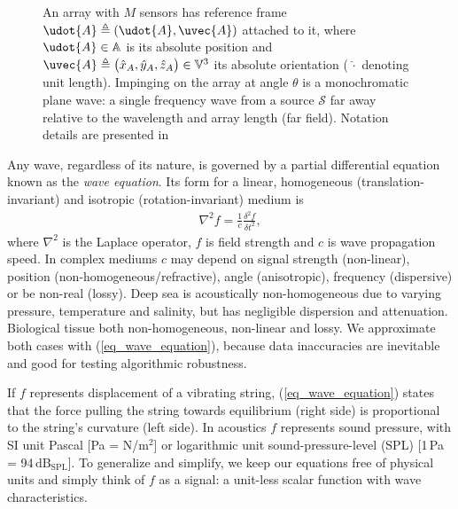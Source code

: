 {\begin{figure}[!t]\centering
{}
\caption{
An array with $M$ sensors has reference frame $\udot{A} \triangleq (\udot{A},\uvec{A})$ attached to it, where $\udot{A}\in\mathbb{A}$ is its absolute position and $\uvec{A}\triangleq\big(\hat{x}_{A},\hat{y}_{A},\hat{z}_{A}\big)\in\mathbb{V}^3$ its absolute orientation (\,$\hat{\cdot}$ denoting unit length). Impinging on the array at angle $\theta$ is a monochromatic plane wave: a single frequency wave from a source $\mathcal{S}$ far away relative to the wavelength and array length (far field). Notation details are presented in 
}%
\label{2_fig_geometry}
\end{figure}


Any wave, regardless of its nature, is governed by a partial differential equation known as the \emph{wave equation}. Its form for a linear, homogeneous (translation-invariant) and isotropic (rotation-invariant) medium is
%
\begin{align}\label{eq_wave_equation}
\nabla^2 f 
 = \frac{1}{c}\frac{\delta^2 f}{\delta t^2},
\end{align}
%
where $\nabla^2$ is the Laplace operator, $f$ is field strength and $c$ is wave propagation speed. In complex mediums $c$ may depend on signal strength (non-linear), position (non-homogeneous/refractive), angle (anisotropic), frequency (dispersive) or be non-real (lossy). Deep sea is acoustically non-homogeneous due to varying pressure, temperature and salinity, but has negligible dispersion and attenuation. Biological tissue both non-homogeneous, non-linear and lossy. We approximate both cases with (\ref{eq_wave_equation}), because data inaccuracies are inevitable and good for testing algorithmic robustness.

If $f$ represents displacement of a vibrating string, (\ref{eq_wave_equation}) states that the force pulling the string towards equilibrium (right side) is proportional to the string's curvature (left side). In acoustics $f$ represents sound pressure, with SI unit Pascal [Pa = N/m$^2$] or logarithmic unit sound-pressure-level (SPL) [1\,Pa = 94\,$\mathrm{dB}_{\textrm{SPL}}$]. To generalize and simplify, we keep our equations free of physical units and simply think of $f$ as a signal: a unit-less scalar function with wave characteristics.

}
